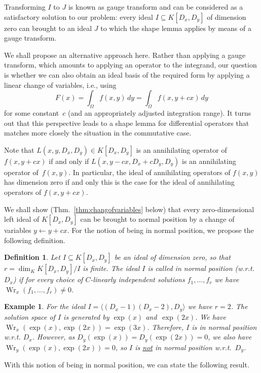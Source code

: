 \documentclass[a4paper,draft]{amsart}
\def\<#1>{\langle#1\rangle}
\def\Wr{\operatorname{Wr}}
\newtheorem{defi}[thm]{Definition}
\newtheorem{ex}[thm]{Example}
\begin{document}
Transforming $I$ to $J$ is known as gauge transform and can be considered as a
satisfactory solution to our problem: every ideal $I\subseteq K[D_x,D_y]$ of dimension
zero can brought to an ideal $J$ to which the shape lemma applies by means of a
gauge transform. 

We shall propose an alternative approach here. Rather than applying a gauge transform,
which amounts to applying an operator to the integrand, our question is whether we
can also obtain an ideal basis of the required form by applying a linear change of
variables, i.e., using
\[
  F(x) = \int_\Omega f(x,y)\,dy = \int_{\tilde\Omega} f(x,y+cx)\,dy
\]
for some constant~$c$ (and an appropriately adjusted integration range). It turns out
that this perspective leads to a shape lemma for differential operators that matches
more closely the situation in the commutative case. 

Note that $L(x,y,D_x,D_y)\in K[D_x,D_y]$ is an annihilating operator of $f(x,y+cx)$ if and only if
$L(x,y-cx,D_x+cD_y,D_y)$ is an annihilating operator of~$f(x,y)$. In particular, the ideal
of annihilating operators of $f(x,y)$ has dimension zero if and only this is the case for
the ideal of annihilating operators of $f(x,y+cx)$.

We shall show (Thm.~\ref{thm:changofvariables} below) that every
zero-dimensional left ideal of $K[D_x,D_y]$ can be brought to normal position
by a change of variables $y\leftarrow y+cx$. For the notion of being in normal
position, we propose the following definition.

\begin{defi}\label{def:normal}
  Let $I\subseteq K[D_x,D_y]$ be an ideal of dimension zero,
  so that $r=\dim_K K[D_x,D_y]/I$ is finite.
  The ideal $I$ is called \emph{in normal position} (w.r.t.~$D_x$) if for every
  choice of $C$-linearly independent solutions $f_1,\dots,f_r$
  we have $\Wr_x(f_1,\dots,f_r)\neq0$.
\end{defi}

\begin{ex}
  For the ideal $I=\<(D_x-1)(D_x-2),D_y>$ we have $r=2$. The
  solution space of $I$ is generated by $\exp(x)$ and~$\exp(2x)$.
  We have $\Wr_x(\exp(x),\exp(2x))=\exp(3x)$. Therefore, $I$ is
  in normal position w.r.t. $D_x$.
  However, as $D_y(\exp(x))=D_y(\exp(2x))=0$, we also
  have $\Wr_y(\exp(x),\exp(2x))=0$, so $I$ is \underline{not} in
  normal position w.r.t.~$D_y$.
\end{ex}

With this notion of being in normal position, we can state the following result. 
\end{document}
